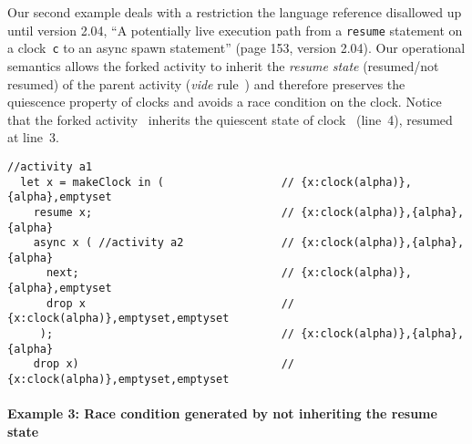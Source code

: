 Our second example deals with a restriction the language reference
disallowed up until version 2.04, ``A potentially live execution path
from a \texttt{resume} statement on a clock~\texttt{c} to an async
spawn statement'' (page 153, version 2.04).
Our operational semantics allows the forked activity to inherit the
\emph{resume state} (resumed/not resumed) of the parent activity
(\textit{vide} rule~) and therefore preserves the quiescence
property of clocks and avoids a race condition on the clock. Notice
that the forked activity~ inherits the quiescent state of clock
~(line~4), resumed at line~3.
\begin{lstlisting}[numbers=right]
  //activity a1
  let x = makeClock in (                  // {x:clock(alpha)},{alpha},emptyset
    resume x;                             // {x:clock(alpha)},{alpha},{alpha}
    async x ( //activity a2               // {x:clock(alpha)},{alpha},{alpha}
      next;                               // {x:clock(alpha)},{alpha},emptyset
      drop x                              // {x:clock(alpha)},emptyset,emptyset
     );                                   // {x:clock(alpha)},{alpha},{alpha}
    drop x)                               // {x:clock(alpha)},emptyset,emptyset
\end{lstlisting}

\paragraph{Example 3: Race condition generated by not inheriting the
  resume state}

